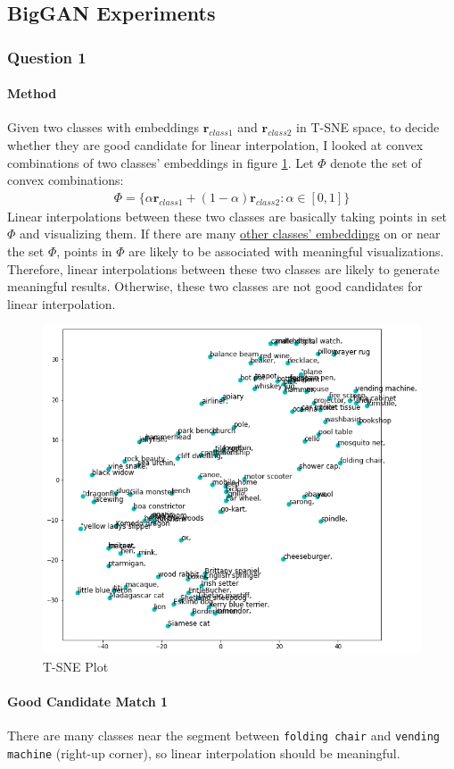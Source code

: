 \documentclass{article}
\begin{document}
	\subsection{BigGAN Experiments}
	\subsubsection{Question 1}
	\paragraph{Method} Given two classes with embeddings $\mathbf{r}_{class1}$ and $\mathbf{r}_{class2}$ in T-SNE space, to decide whether they are good candidate for linear interpolation, I looked at convex combinations of two classes' embeddings in figure \ref{tsne}.
	Let $\Phi$ denote the set of convex combinations:
	\begin{align}
		\Phi = \{\alpha \mathbf{r}_{c l a s s 1}+(1-\alpha) \mathbf{r}_{c l a s s 2}: \alpha \in[0,1]\}
	\end{align}
	Linear interpolations between these two classes are basically taking points in set $\Phi$ and visualizing them.
	If there are many \ul{other classes' embeddings} on or near the set $\Phi$, points in $\Phi$ are likely to be associated with meaningful visualizations.
	Therefore, linear interpolations between these two classes are likely to generate meaningful results.
	Otherwise, these two classes are not good candidates for linear interpolation.
	\begin{figure}[H]
		\caption{T-SNE Plot}
		\centering
		\label{tsne}
		\medbreak
		\includegraphics[width=0.7\linewidth]{./tsne.png}
	\end{figure}
	\paragraph{Good Candidate Match 1} There are many classes near the segment between \texttt{folding chair} and \texttt{vending machine} (right-up corner), so linear interpolation should be meaningful.
	
\end{document}
